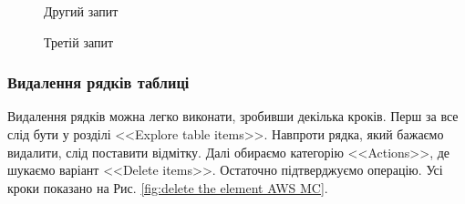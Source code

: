 \documentclass[a4paper,14pt]{extarticle} %
\begin{document}
\begin{figure}[H]
    \caption{Другий запит}
    \label{fig:second scan AWS MC}
\end{figure}

\begin{figure}[H]
    \begin{minipage}[H]{1\linewidth}
    \end{minipage}
    \vfill
    \begin{minipage}[H]{1\linewidth}
        \vspace{0.1cm}
        \caption{Третій запит}
        \label{fig:third scan AWS MC}
    \end{minipage}
\end{figure}

\subsubsection*{Видалення рядків таблиці}

Видалення рядків можна легко виконати, зробивши декілька кроків. Перш за все слід бути у розділі 
<<Explore table items>>. Навпроти рядка, який бажаємо видалити, слід поставити відмітку. Далі обираємо 
категорію <<Actions>>, де шукаємо варіант <<Delete items>>. Остаточно підтверджуємо операцію. Усі кроки 
показано на Рис. \ref{fig:delete the element AWS MC}.
\end{document}
